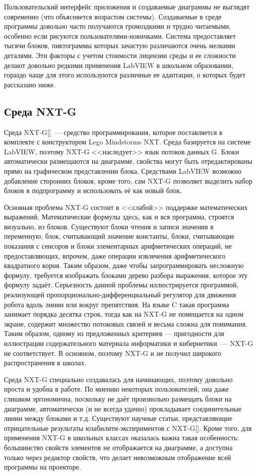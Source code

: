 \documentclass[a5paper]{article}
\begin{document}
Пользовательский интерфейс приложения и создаваемые диаграммы не выглядят современно (что объясняется возрастом 
системы). Создаваемые в среде программы довольно часто получаются громоздкими и трудно читаемыми, особенно 
если рисуются пользователями-новичками. Система предоставляет тысячи блоков, пиктограммы которых зачастую 
различаются очень мелкими деталями. Эти факторы с учетом стоимости лицензии среды и ее сложности делают 
довольно редкими применения LabVIEW в школьном образовании, гораздо чаще для этого используются различные 
ее адаптации, о которых будет рассказано ниже.

\subsection{Среда NXT-G}

Среда NXT-G[]~--- средство программирования, которое поставляется в комплекте с конструктором Lego Mindstorms 
NXT. Среда базируется на системе LabVIEW, поэтому NXT-G <<наследует>> язык потоков данных G. Блоки автоматически 
размещаются на диаграмме, свойства могут быть отредактированы прямо на графическом представлении блока. 
Средствами LabVIEW возможно добавление сторонних блоков, кроме того, сам NXT-G позволяет выделить набор 
блоков в подпрограмму и использовать её как новый блок.

Основная проблема NXT-G состоит в <<слабой>> поддержке математических выражений. Математические формулы 
здесь, как и вся программа, строятся визуально, из блоков. Существуют блоки чтения и записи значения в 
переменную, блок, считывающий значение константы, блоки, считывающие показания с сенсоров и блоки элементарных 
арифметических операций, не предоставляющих, впрочем, даже операции извлечения арифметического квадратного корня. 
Таким образом, даже чтобы запрограммировать несложную формулу, требуется изображать блоками дерево разбора выражения, 
которое эту формулу задаёт. Серьезность данной проблемы иллюстрируется программой, реализующей 
пропорционально-дифференциальный регулятор для движения робота вдоль линии или вокруг препятствия. На языке C 
такая программа занимает порядка десятка строк, тогда как на NXT-G не помещается на одном экране, содержит 
множество потоковых связей и весьма сложна для понимания. Таким образом, одному из предложенных критериев --- 
пригодности для иллюстрации содержательного материала информатики и кибернетики~--- NXT-G не соответствует. 
В основном, поэтому NXT-G и не получил широкого распространения в школах.

Среда NXT-G специально создавалась для начинающих, поэтому довольно проста и удобна в работе. По мнению 
некоторых пользователей, она даже слишком эргономична, поскольку не даёт произвольно размещать блоки на диаграмме, 
автоматически (и не всегда удачно) прокладывает соединительные линии между блоками и т.д. Существуют научные статьи, 
представляющие отрицательные результаты юзабилити-экспериментов с NXT-G[]. Кроме того, для применения NXT-G 
в школьных классах оказалась важна такая особенность: большинство свойств элементов не отображается на диаграмме, 
а доступна только через редактор свойств, что делает невозможным отображение всей программы на проекторе. 
\end{document}
